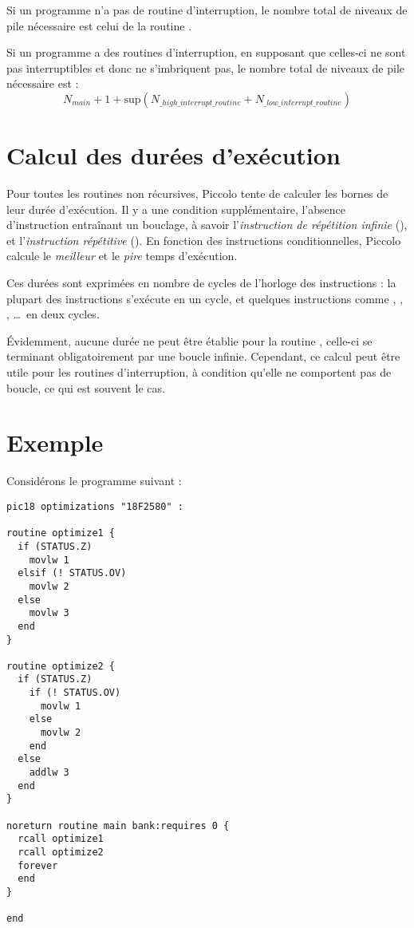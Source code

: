 Si un programme n'a pas de routine d'interruption, le nombre total de niveaux de pile nécessaire est celui de la routine .


Si un programme a des routines d'interruption, en supposant que celles-ci ne sont pas interruptibles et donc ne s'imbriquent pas, le nombre total de niveaux de pile nécessaire est :
\begin{equation*}
  N_{main} + 1 + \text{sup} \left(N_{\_high\_interrupt\_routine} + N_{\_low\_interrupt\_routine}\right)
\end{equation*}



\section{Calcul des durées d'exécution}

Pour toutes les routines non récursives, Piccolo tente de calculer les bornes de leur durée d'exécution. Il y a une condition supplémentaire, l'absence d'instruction entraînant un bouclage, à savoir l'\emph{instruction de répétition infinie} (), et l'\emph{instruction répétitive} (). En fonction des instructions conditionnelles, Piccolo calcule le \emph{meilleur} et le \emph{pire} temps d'exécution.

Ces durées sont exprimées en nombre de cycles de l'horloge des instructions : la plupart des instructions s'exécute en un cycle, et quelques instructions comme , , , \dots\ en deux cycles.

Évidemment, aucune durée ne peut être établie pour la routine , celle-ci se terminant obligatoirement par une boucle infinie. Cependant, ce calcul peut être utile pour les routines d'interruption, à condition qu'elle ne comportent pas de boucle, ce qui est souvent le cas.

\section{Exemple}

Considérons le programme suivant :

\begin{lstlisting}[language=piccolo]
pic18 optimizations "18F2580" :

routine optimize1 {
  if (STATUS.Z)
    movlw 1
  elsif (! STATUS.OV)
    movlw 2
  else
    movlw 3
  end
}

routine optimize2 {
  if (STATUS.Z)
    if (! STATUS.OV)
      movlw 1
    else
      movlw 2
    end
  else
    addlw 3
  end
}

noreturn routine main bank:requires 0 {
  rcall optimize1
  rcall optimize2
  forever
  end
}

end
\end{lstlisting}

